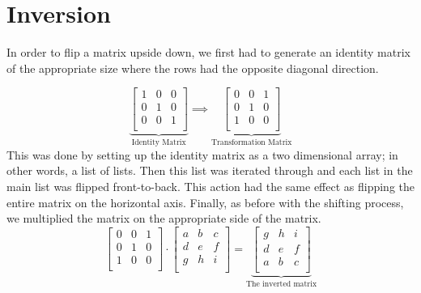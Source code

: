 \section{Inversion}

In order to flip a matrix upside down, we first had to generate an identity
matrix of the appropriate size where the rows had the opposite diagonal
direction.

\[
  \underbrace{
    \begin{bmatrix}
      1&0&0\\
      0&1&0\\
      0&0&1\\
    \end{bmatrix}
  }_{\text{Identity Matrix}}
  \implies
  \underbrace{
    \begin{bmatrix}
      0&0&1\\
      0&1&0\\
      1&0&0\\
    \end{bmatrix}
  }_{\text{Transformation
  Matrix}}
\]
This was done by setting up the identity matrix as a two dimensional array; in
other words, a list of lists. Then this list was iterated through and each list
in the main list was flipped front-to-back. This action had the same effect as
flipping the entire matrix on the horizontal axis. Finally, as before with the
shifting process, we multiplied the matrix on the appropriate side of the
matrix.
\[ 
  \begin{bmatrix}
    0&0&1\\
    0&1&0\\
    1&0&0\\
  \end{bmatrix}
  \cdot
  \begin{bmatrix}
    a&b&c\\
    d&e&f\\
    g&h&i\\
  \end{bmatrix}
  =
  \underbrace{
  \begin{bmatrix}
    g&h&i\\
    d&e&f\\
    a&b&c\\
  \end{bmatrix}
  }_{\text{The
  inverted  
  matrix}}
\]

